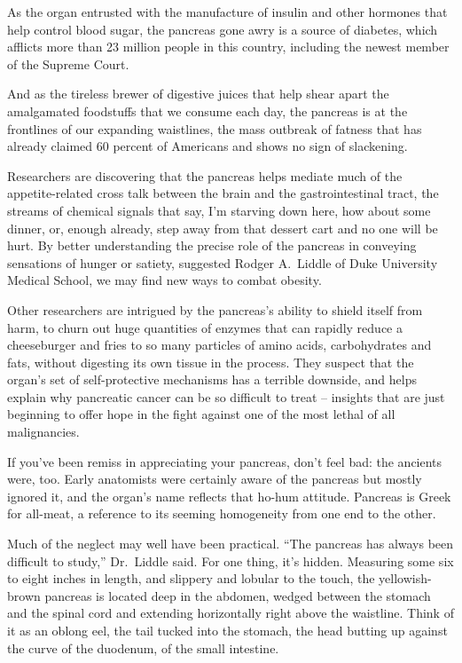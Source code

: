 ﻿\documentclass[12pt]{article}
\begin{document}
As the organ entrusted with the manufacture of insulin and other hormones that help control blood
sugar, the pancreas gone awry is a source of diabetes, which afflicts more than 23 million people in
this country, including the newest member of the Supreme Court.

And as the tireless brewer of digestive juices that help shear\cite{shear} apart the amalgamated
foodstuffs that we consume each day, the pancreas is at the frontlines of our expanding waistlines,
the mass outbreak of fatness that has already claimed 60 percent of Americans and shows no sign of
slackening\cite{slacken}.

Researchers are discovering that the pancreas helps mediate much of the appetite-related cross talk
between the brain and the gastrointestinal tract, the streams of chemical signals that say, I'm
starving down here, how about some dinner, or, enough already, step away from that dessert cart and
no one will be hurt. By better understanding the precise role of the pancreas in conveying
sensations of hunger or satiety, suggested Rodger A.~Liddle of Duke University Medical School, we
may find new ways to combat obesity.

Other researchers are intrigued by the pancreas's ability to shield itself from harm, to churn out
huge quantities of enzymes that can rapidly reduce a cheeseburger and fries to so many particles of
amino acids, carbohydrates and fats, without digesting its own tissue in the process. They suspect
that the organ's set of self-protective mechanisms has a terrible downside, and helps explain why
pancreatic cancer can be so difficult to treat -- insights that are just beginning to offer hope in
the fight against one of the most lethal of all malignancies.

If you've been remiss in appreciating your pancreas, don't feel bad: the ancients were, too. Early
anatomists were certainly aware of the pancreas but mostly ignored it, and the organ's name reflects
that ho-hum attitude. Pancreas is Greek for all-meat, a reference to its seeming homogeneity from
one end to the other.

Much of the neglect may well have been practical. ``The pancreas has always been difficult to
study,'' Dr.~Liddle said. For one thing, it's hidden. Measuring some six to eight inches in length,
and slippery and lobular to the touch, the yellowish-brown pancreas is located deep in the abdomen,
wedged between the stomach and the spinal cord and extending horizontally right above the waistline.
Think of it as an oblong eel, the tail tucked into the stomach, the head butting up against the
curve of the duodenum, of the small intestine.
\end{document}
